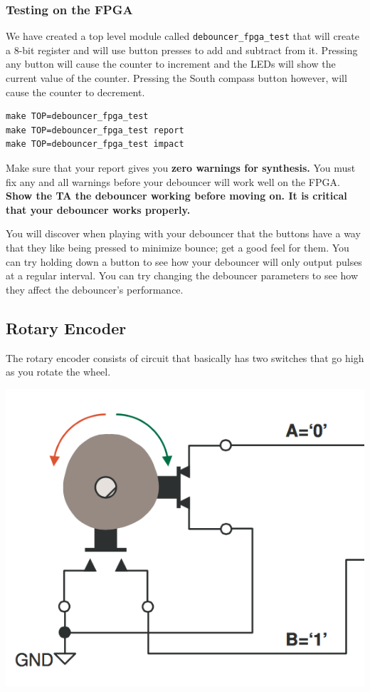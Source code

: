 \documentclass[11pt]{article}
\begin{document}
\subsubsection{Testing on the FPGA}
We have created a top level module called \verb|debouncer_fpga_test| that will create a 8-bit register and will use button presses to add and subtract from it. Pressing any button will cause the counter to increment and the LEDs will show the current value of the counter. Pressing the South compass button however, will cause the counter to decrement. 

\begin{verbatim}
make TOP=debouncer_fpga_test
make TOP=debouncer_fpga_test report
make TOP=debouncer_fpga_test impact
\end{verbatim} 

Make sure that your report gives you \textbf{zero warnings for synthesis.} You must fix any and all warnings before your debouncer will work well on the FPGA.\\

\textbf{Show the TA the debouncer working before moving on. It is critical that your debouncer works properly.}

You will discover when playing with your debouncer that the buttons have a way that they like being pressed to minimize bounce; get a good feel for them. You can try holding down a button to see how your debouncer will only output pulses at a regular interval. You can try changing the debouncer parameters to see how they affect the debouncer's performance.

\subsection{Rotary Encoder}

The rotary encoder consists of circuit that basically has two switches that go high as you rotate the wheel. 

\includegraphics[width=\textwidth]{images/lab2_fig5.png}
\end{document}
